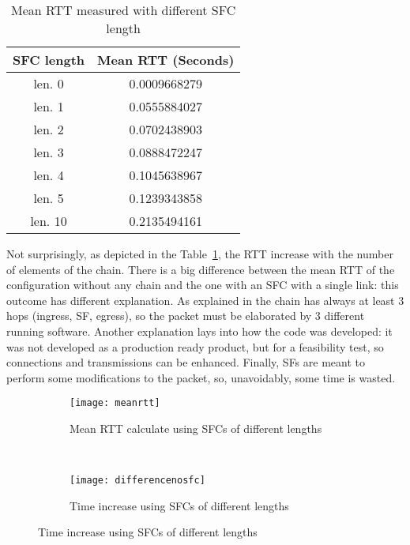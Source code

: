 \begin{table}[H]
\centering
\begin{tabular}{@{}cc@{}}
\toprule
\textbf{SFC length} & \textbf{Mean RTT (Seconds)} \\ \midrule
len. 0              & 0.0009668279      \\
len. 1              & 0.0555884027      \\
len. 2              & 0.0702438903      \\
len. 3              & 0.0888472247      \\
len. 4              & 0.1045638967      \\
len. 5              & 0.1239343858      \\
len. 10             & 0.2135494161      \\ \bottomrule
\end{tabular}
\caption{Mean RTT measured with different SFC length}
\label{chap:tests:sec:rtt:tab:meanrtt}
\end{table}

Not surprisingly, as depicted in the Table~\ref{chap:tests:sec:rtt:tab:meanrtt},
the RTT increase with the number of elements of the chain. There is a big
difference between the mean RTT of the configuration without any chain and the
one with an SFC with a single link: this outcome has different explanation. As
explained in  the chain has always at
least 3 hops (ingress, SF, egress), so the packet must be elaborated by 3
different running software. Another explanation lays into how the code was
developed: it was not developed as a production ready product, but for a
feasibility test, so connections and transmissions can be enhanced. Finally, SFs
are meant to perform some modifications to the packet, so, unavoidably, some
time is wasted. 

\begin{figure}[H]
    \begin{subfigure}[b]{0.45\textwidth}
        \texttt{[image: meanrtt]}
        \caption{Mean RTT calculate using SFCs of different lengths}
        \label{chap:tests:sec:rtt:img:meanstt}
    \end{subfigure}
    ~
    \begin{subfigure}[b]{0.45\textwidth}
        \texttt{[image: differencenosfc]}
        \caption{Time increase using SFCs of different lengths}
        \label{chap:tests:sec:rtt:img:differencertt}
    \end{subfigure}
\end{figure}

